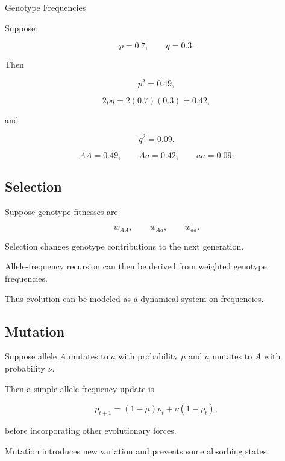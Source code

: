 \begin{workedexamplebox}{Genotype Frequencies}

Suppose

\[
p=0.7,
\qquad
q=0.3.
\]

Then

\[
p^2=0.49,
\]

\[
2pq
=
2(0.7)(0.3)
=
0.42,
\]

and

\[
q^2=0.09.
\]

\begin{answerbox}
\[
\boxed{
AA=0.49,
\qquad
Aa=0.42,
\qquad
aa=0.09.
}
\]
\end{answerbox}

\end{workedexamplebox}

\subsection{Selection}
\label{subsec:population-genetic-selection}

Suppose genotype fitnesses are

\[
w_{AA},
\qquad
w_{Aa},
\qquad
w_{aa}.
\]

Selection changes genotype contributions to the next generation.

Allele-frequency recursion can then be derived from weighted genotype
frequencies.

Thus evolution can be modeled as a dynamical system on frequencies.

\subsection{Mutation}
\label{subsec:population-genetic-mutation}

Suppose allele \(A\) mutates to \(a\) with probability \(\mu\) and \(a\)
mutates to \(A\) with probability \(\nu\).

Then a simple allele-frequency update is

\[
\boxed{
p_{t+1}
=
(1-\mu)p_t
+
\nu(1-p_t),
}
\]

before incorporating other evolutionary forces.

Mutation introduces new variation and prevents some absorbing states.

